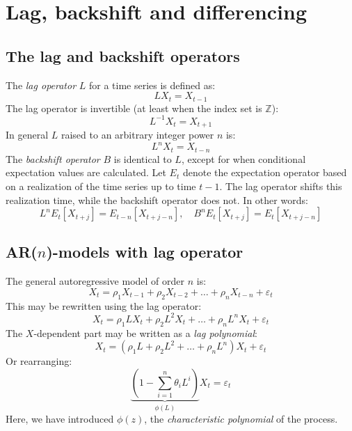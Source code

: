 \documentclass[12pt, a4paper]{article}
\numberwithin{equation}{section}
\begin{document}
\section{Lag, backshift and differencing}

\subsection{The lag and backshift operators}
The \textit{lag operator} $L$ for a time series is defined as:
\begin{equation}
LX_t=X_{t-1}
\end{equation}
The lag operator is invertible (at least when the index set is $\mathbb{Z}$):
\begin{equation}
L^{-1}X_t=X_{t+1}
\end{equation}
In general $L$ raised to an arbitrary integer power $n$ is:
\begin{equation}
L^n X_t=X_{t-n}
\end{equation}
The \textit{backshift operator} $B$ is identical to $L$, except for when conditional expectation values are calculated. Let $E_t$ denote the expectation operator based on a realization of the time series up to time $t-1$. The lag operator shifts this realization time, while the backshift operator does not. In other words:
\begin{equation}
L^n E_t[X_{t+j}]=E_{t-n}[X_{t+j-n}],\quad B^n E_t[X_{t+j}]=E_t[X_{t+j-n}]
\end{equation}

\subsection{AR($n$)-models with lag operator}
The general autoregressive model of order $n$ is:
\begin{equation}
X_t=\rho_1 X_{t-1}+\rho_2 X_{t-2}+\ldots+\rho_n X_{t-n}+\varepsilon_t
\end{equation}
This may be rewritten using the lag operator:
\begin{equation}
X_t=\rho_1 L X_t+\rho_2 L^2 X_t+\ldots+\rho_n L^n X_t+\varepsilon_t
\end{equation}
The $X$-dependent part may be written as a \textit{lag polynomial}:
\begin{equation}
X_t=(\rho_1 L+\rho_2 L^2+\ldots+\rho_n L^n)X_t+\varepsilon_t
\end{equation}
Or rearranging:
\begin{equation}
\label{AR_polynomial}
\underbrace{\left(1-\sum_{i=1}^n\theta_i L^i\right)}_{\phi(L)}X_t=\varepsilon_t
\end{equation}
Here, we have introduced $\phi(z)$, the \textit{characteristic polynomial} of the process.
\end{document}
